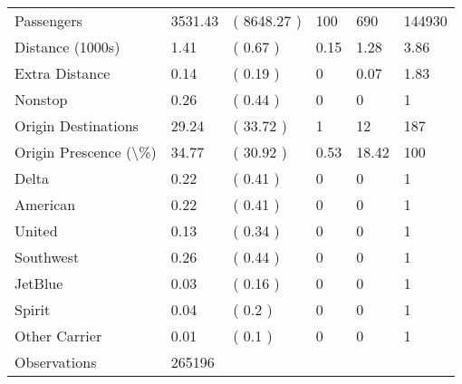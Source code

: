 \begin{tabular}[t]{llllll}
\hspace{1em}Passengers & 3531.43 & ( 8648.27 ) & 100 & 690 & 144930\\
\hspace{1em}Distance (1000s) & 1.41 & ( 0.67 ) & 0.15 & 1.28 & 3.86\\
\hspace{1em}Extra Distance & 0.14 & ( 0.19 ) & 0 & 0.07 & 1.83\\
\hspace{1em}Nonstop & 0.26 & ( 0.44 ) & 0 & 0 & 1\\
\hspace{1em}Origin Destinations & 29.24 & ( 33.72 ) & 1 & 12 & 187\\
\hspace{1em}Origin Prescence (\textbackslash{}\%) & 34.77 & ( 30.92 ) & 0.53 & 18.42 & 100\\
\hspace{1em}Delta & 0.22 & ( 0.41 ) & 0 & 0 & 1\\
\hspace{1em}American & 0.22 & ( 0.41 ) & 0 & 0 & 1\\
\hspace{1em}United & 0.13 & ( 0.34 ) & 0 & 0 & 1\\
\hspace{1em}Southwest & 0.26 & ( 0.44 ) & 0 & 0 & 1\\
\hspace{1em}JetBlue & 0.03 & ( 0.16 ) & 0 & 0 & 1\\
\hspace{1em}Spirit & 0.04 & ( 0.2 ) & 0 & 0 & 1\\
\hspace{1em}Other Carrier & 0.01 & ( 0.1 ) & 0 & 0 & 1\\
\hspace{1em}Observations & 265196 &  &  &  & \\
\bottomrule
\end{tabular}
